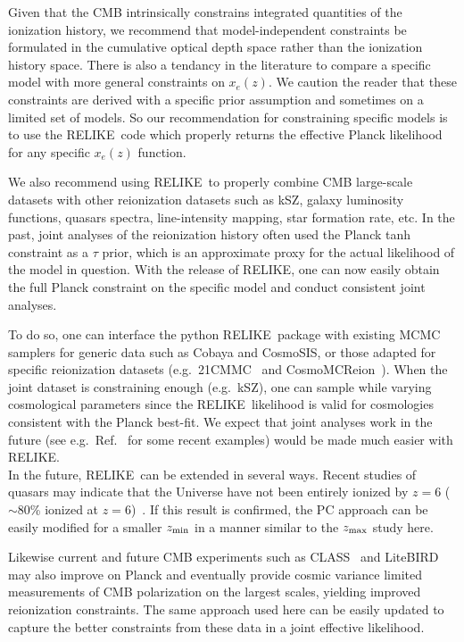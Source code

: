 \documentclass[aps,prd,twocolumn,amsmath,amssymb,showpacs,floatfix,superscriptaddress,nofootinbib]{revtex4-1}
\newcommand{\zmax}{z_{\rm max}}
\newcommand{\zmin}{z_{\rm min}}
\newcommand{\relike}{RELIKE}
\begin{document}
{Given that the CMB intrinsically constrains integrated quantities of the ionization history, we recommend that model-independent constraints be formulated in the cumulative optical depth space rather than the ionization history space. There is also a tendancy in the literature to compare a specific model with more general constraints on $x_e(z)$. We caution the reader that these constraints are derived with a specific prior assumption and sometimes on a limited set of models. So our recommendation for constraining specific models is to use the \relike\  code which properly returns the effective Planck likelihood for any specific $x_e(z)$ function.

We also recommend using \relike\  to properly combine CMB large-scale datasets with other reionization datasets such as kSZ, galaxy luminosity functions, quasars spectra, line-intensity mapping, star formation rate, etc. In the past, joint analyses of the reionization history often used the Planck tanh constraint as a $\tau$ prior, which is an approximate proxy for the actual likelihood of the model in question. With the release of \relike, one can now easily obtain the full Planck constraint on the specific model and conduct consistent joint analyses. 

To do so, one can interface the python \relike\  package with existing MCMC samplers for generic data such as Cobaya and CosmoSIS, or those adapted for specific reionization datasets (e.g.\ 21CMMC~\cite{Greig:2015qca} and CosmoMCReion~\cite{Chatterjee:2021ygm}). When the joint dataset is constraining enough (e.g.\ kSZ), one can sample while varying cosmological parameters since the \relike\  likelihood is valid for cosmologies consistent with the Planck best-fit. We expect that joint analyses work in the future (see e.g.\ Ref.~\cite{Ahn:2020btj, Qin:2020xrg} for some recent examples) would be made much easier with \relike. \\

In the future, \relike\ can be extended in several ways.
Recent studies of quasars may indicate that the Universe have not been entirely ionized by $z = 6$ ($\sim$80\% ionized at $z = 6$)~\cite{Becker:2021jyx}. If this result is confirmed, the PC approach can be easily modified for a smaller $\zmin$ in a manner similar to the $\zmax$ study here. 

Likewise current and future CMB experiments such as CLASS~\cite{Watts:2018etg, Watts:2019uvq} and LiteBIRD~\cite{Hazumi:2021yqq} may also improve on Planck and eventually provide cosmic variance limited measurements of CMB polarization on the largest scales, yielding improved reionization constraints. The same approach used here can be easily updated to capture the better constraints from these data in a joint effective likelihood. \\

}
\end{document}
